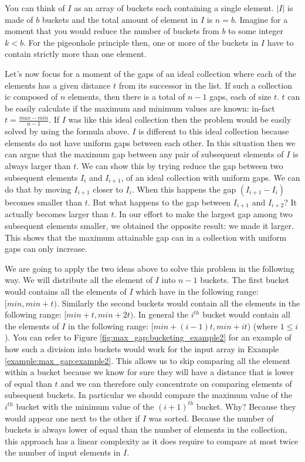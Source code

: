 You can think of $I$ as an array of buckets each containing a single element. $|I|$ is made of $b$ buckets and the total amount of element in $I$ is $n=b$.
Imagine for a moment that you would reduce the number of buckets from $b$ to some integer $k < b$.
For the pigeonhole principle then, one or more of the buckets in $I$ have to contain  strictly more than one element.

Let's now focus for a moment of the gaps of an ideal collection where each of the elements has a given distance $t$ from its successor in the list. 
If such a collection ic composed of  $n$ elements, then there is a total of $n-1$ gaps, each of size $t$.
$t$ can be easily calculate if the maximum and minimum values are known: in-fact $t=\frac{max-min}{n-1}$. 
If $I$ was like this ideal collection then the problem would be easily solved by using the formula above. 
$I$ is different to this ideal collection because elements do not have uniform gaps between each other. 
In this situation then we can argue that the maximum gap between any pair of subsequent 
elements of $I$ is always larger than $t$.
We can show this by trying reduce the gap between two subsequent elements $I_{i}$ and $I_{i+1}$, of an ideal collection with uniform gaps.
We can do that by moving $I_{i+1}$ closer to $I_{i}$. When this happens the gap $(I_{i+1}-I_{i})$ becomes smaller than $t$. But what happens to the gap between $I_{i+1}$ and $I_{i+2}$?
It actually becomes larger than $t$. In our effort to make the largest gap among two subsequent elements smaller, we obtained the opposite result: we made it larger.
This shows that the maximum attainable gap can in a  collection with uniform gaps can only increase. 

We are going to apply the two ideas above to solve this problem in the following way. We will distribute all the element of $I$
into $n-1$ buckets. The first bucket would contains all the elements of $I$ which have in the following range: $[min, min + t)$.
Similarly the second buckets would contain all the elements in the following range: $[min + t, min + 2t)$. 
In general the $i^{th}$ bucket  would contain all the elements of $I$ in the following range: $[min + (i-1)t, min +it)$ (where $ 1 \leq i$).
You can refer to Figure \ref{fig:max_gap:bucketing_example2} for an example of how such a division into buckets would work for the input array in Example \ref{example:max_gap:example2}.
This allows us to skip comparing all the element within a bucket because we know for sure they will have a distance that is lower of equal than $t$ and we can therefore only concentrate on comparing elements 
of subsequent buckets.
In particular we should compare the maximum value of the $i^{th}$ bucket with the minimum value of the $(i+1)^{th}$ bucket. Why? Because they would appear one next to the other if $I$ was sorted.
Because the number of buckets is always lower of equal than the number of elements in the collection, this approach has a linear complexity as it does require to compare at most twice the number of input elements in $I$.


